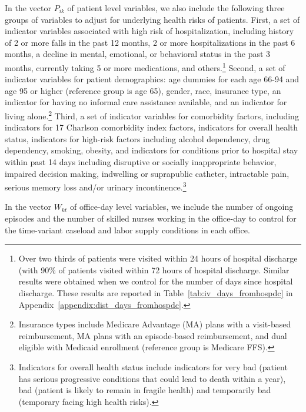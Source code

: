 \documentclass[final,12pt, notitlepage]{article}
\begin{document}
In the vector $P_{ik}$ of patient level variables, we also include the following three groups of variables to adjust for underlying health risks of patients. First, a set of indicator variables associated with high risk of hospitalization, including history of 2 or more falls in the past 12 months, 2 or more hospitalizations in the past 6 months, a decline in mental, emotional, or behavioral status in the past 3 months, currently taking 5 or more medications, and others.\footnote{Over two thirds of patients were visited within 24 hours of hospital discharge (with 90\% of patients visited within 72 hours of hospital discharge. Similar results were obtained when we control for the number of days since hospital discharge. These results are reported in Table~\ref{tab:iv_days_fromhospdc} in Appendix~\ref{appendix:dist_days_fromhospdc}.}
Second, a set of indicator variables for patient demographics: age dummies for each age 66-94 and age 95 or higher (reference group is age 65), gender, race, insurance type, an indicator for having no informal care assistance available, and an indicator for living alone.\footnote{Insurance types include Medicare Advantage (MA) plans with a visit-based reimbursement, MA plans with an episode-based reimbursement, and dual eligible with Medicaid enrollment (reference group is Medicare FFS).
}
Third, a set of indicator variables for comorbidity factors, including indicators for 17 Charlson comorbidity index factors, indicators for overall health status, indicators for high-risk factors including alcohol dependency, drug dependency, smoking, obesity, and indicators for conditions prior to hospital stay within past 14 days including disruptive or socially inappropriate behavior, impaired decision making, indwelling or suprapublic catheter, intractable pain, serious memory loss and/or urinary incontinence.\footnote{Indicators for overall health status include indicators for very bad (patient has serious progressive conditions that could lead to death within a year), bad (patient is likely to remain in fragile health) and temporarily bad (temporary facing high health risks).
}

In the vector $W_{kt}$ of office-day level variables, we include the number of ongoing episodes and the number of skilled nurses working in the office-day to control for the time-variant caseload and labor supply conditions in each office.
\end{document}

